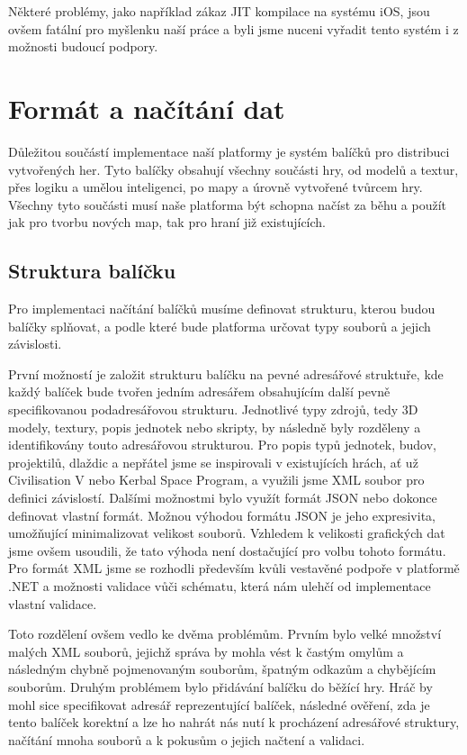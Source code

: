Některé problémy, jako například zákaz JIT kompilace na systému iOS, jsou ovšem fatální pro myšlenku naší práce a byli jsme nuceni vyřadit tento systém i z možnosti budoucí podpory.

\section{Formát a načítání dat}
Důležitou součástí implementace naší platformy je systém balíčků pro distribuci vytvořených her. Tyto balíčky obsahují všechny součásti hry, od modelů a textur, přes logiku a umělou inteligenci, po mapy a úrovně vytvořené tvůrcem hry. Všechny tyto součásti musí naše platforma být schopna načíst za běhu a použít jak pro tvorbu nových map, tak pro hraní již existujících.

\subsection{Struktura balíčku}
Pro implementaci načítání balíčků musíme definovat strukturu, kterou budou balíčky splňovat, a podle které bude platforma určovat typy souborů a jejich závislosti.

První možností je založit strukturu balíčku na pevné adresářové struktuře, kde každý balíček bude tvořen jedním adresářem obsahujícím další pevně specifikovanou podadresářovou strukturu. Jednotlivé typy zdrojů, tedy 3D modely, textury, popis jednotek nebo skripty, by následně byly rozděleny a identifikovány touto adresářovou strukturou. Pro popis typů jednotek, budov, projektilů, dlaždic a nepřátel jsme se inspirovali v existujících hrách, ať už Civilisation V nebo Kerbal Space Program, a využili jsme XML soubor pro definici závislostí. Dalšími možnostmi bylo využít formát JSON nebo dokonce definovat vlastní formát. Možnou výhodou formátu JSON je jeho expresivita, umožňující minimalizovat velikost souborů. Vzhledem k velikosti grafických dat jsme ovšem usoudili, že tato výhoda není dostačující pro volbu tohoto formátu. Pro formát XML jsme se rozhodli především kvůli vestavěné podpoře v platformě .NET a možnosti validace vůči schématu, která nám ulehčí od implementace vlastní validace. 

Toto rozdělení ovšem vedlo ke dvěma problémům. Prvním bylo velké množství malých XML souborů, jejichž správa by mohla vést k častým omylům a následným chybně pojmenovaným souborům, špatným odkazům a chybějícím souborům. Druhým problémem bylo přidávání balíčku do běžící hry. Hráč by mohl sice specifikovat adresář reprezentující balíček, následné ověření, zda je tento balíček korektní a lze ho nahrát nás nutí k procházení adresářové struktury, načítání mnoha souborů a k pokusům o jejich načtení a validaci.

